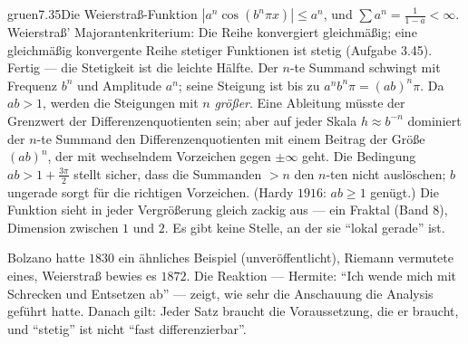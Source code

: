 \begin{loesungkarte}{gruen}{7.35}{Die Weierstraß-Funktion}
$|a^{n}\cos(b^{n}\pi x)|\le a^{n}$, und $\sum a^{n} = \frac1{1 - a} < \infty$. Weierstraß' Majorantenkriterium: Die Reihe konvergiert gleichmäßig; eine gleichmäßig konvergente Reihe stetiger Funktionen ist stetig (Aufgabe 3.45). Fertig --- die Stetigkeit ist die leichte Hälfte.
Der $n$-te Summand schwingt mit Frequenz $b^{n}$ und Amplitude $a^{n}$; seine Steigung ist bis zu $a^{n}b^{n}\pi = (ab)^{n}\pi$. Da $ab > 1$, werden die Steigungen mit $n$ \emph{größer}. Eine Ableitung müsste der Grenzwert der Differenzenquotienten sein; aber auf jeder Skala $h\approx b^{-n}$ dominiert der $n$-te Summand den Differenzenquotienten mit einem Beitrag der Größe $(ab)^{n}$, der mit wechselndem Vorzeichen gegen $\pm\infty$ geht. Die Bedingung $ab > 1 + \frac{3\pi}2$ stellt sicher, dass die Summanden $> n$ den $n$-ten nicht auslöschen; $b$ ungerade sorgt für die richtigen Vorzeichen. (Hardy $1916$: $ab\ge1$ genügt.)
Die Funktion sieht in jeder Vergrößerung gleich zackig aus --- ein Fraktal (Band 8), Dimension zwischen $1$ und $2$. Es gibt keine Stelle, an der sie \enquote{lokal gerade} ist.
\begin{mitnehmen}\kastentext
Bolzano hatte $1830$ ein ähnliches Beispiel (unveröffentlicht), Riemann vermutete eines, Weierstraß bewies es $1872$. Die Reaktion --- Hermite: \enquote{Ich wende mich mit Schrecken und Entsetzen ab} --- zeigt, wie sehr die Anschauung die Analysis geführt hatte. Danach gilt: Jeder Satz braucht die Voraussetzung, die er braucht, und \enquote{stetig} ist nicht \enquote{fast differenzierbar}.
\end{mitnehmen}
\end{loesungkarte}

